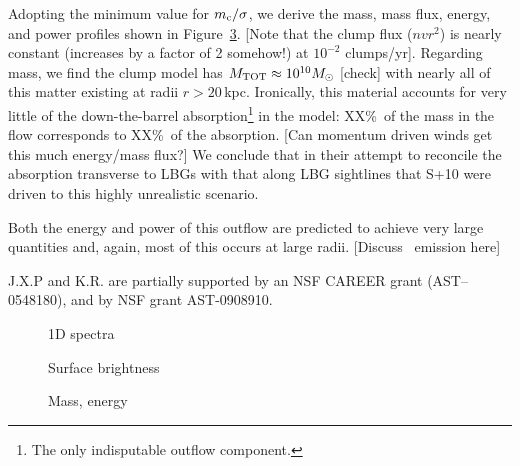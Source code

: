 \documentclass[12pt,preprint]{aastex}
\begin{document}
Adopting the minimum value for $m_{\rm c}/\sigma$,  we derive the mass,
mass flux, energy, and power profiles shown in
Figure~\ref{fig:mass_energy}.
[Note that the clump flux ($nvr^2$) is nearly constant (increases by a
factor of 2 somehow!) at $10^{-2}$ clumps/yr].
Regarding mass, we find the clump model has $M_{\rm TOT} \approx
10^{10} M_\odot$ [check] with nearly all of this matter existing at
radii $r>20$\,kpc.  Ironically, this material accounts for very little
of the down-the-barrel absorption\footnote{The only indisputable
  outflow component.} in the model: XX\%\ of the mass in the flow
corresponds to XX\%\ of the absorption.  
[Can momentum driven winds get this much energy/mass flux?]
We conclude that in their attempt to reconcile the absorption
transverse to LBGs with that along LBG sightlines that S+10 were
driven to this highly unrealistic scenario.

Both the energy and power of this outflow are predicted to achieve
very large quantities and, again, most of this occurs at large radii.
[Discuss \lya\ emission here]

\acknowledgments

J.X.P and K.R. are partially supported
by an NSF CAREER grant (AST--0548180), and 
by NSF grant AST-0908910.

\clearpage

%
%



\clearpage

%

\begin{figure}
\caption{
1D spectra
}
\label{fig:1D}
\end{figure}

\begin{figure}
\caption{
Surface brightness
}
\label{fig:SB}
\end{figure}

\begin{figure}
\caption{
Mass, energy
}
\label{fig:mass_energy}
\end{figure}
\end{document}
